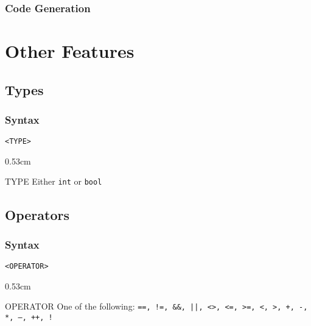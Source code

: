 \documentclass[twoside]{report}
\newenvironment{mycompactdesc}{\begin{adjustwidth}{0.53cm}{}\begin{compactdesc}}{\end{compactdesc}\end{adjustwidth}}
\begin{document}
\subsubsection*{Code Generation}


\section{Other Features}
\label{def:other_features}


\subsection{Types}
\label{def:types}
\subsubsection*{Syntax}
\texttt{<TYPE>}
\begin{mycompactdesc}
	\item[TYPE] Either \texttt{int} or \texttt{bool}
\end{mycompactdesc}


\subsection{Operators}
\label{def:operators}
\subsubsection*{Syntax}
\texttt{<OPERATOR>}
\begin{mycompactdesc}
	\item[OPERATOR] One of the following: \texttt{==, !=, \&\&, ||, <>, <=, >=, <, >, +, -, *, --, ++, !}
\end{mycompactdesc}
\end{document}
